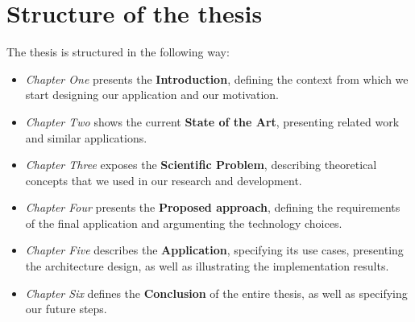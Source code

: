 \section{Structure of the thesis}
\label{section:structureOfTheThesis}

The thesis is structured in the following way:

\begin{itemize}
    \item \textit{Chapter One} presents the \textbf{Introduction}, defining the context from which we start designing our application and our motivation.
    \item \textit{Chapter Two} shows the current \textbf{State of the Art}, presenting related work and similar applications.
    \item \textit{Chapter Three} exposes the \textbf{Scientific Problem}, describing theoretical concepts that we used in our research and development.
    \item \textit{Chapter Four} presents the \textbf{Proposed approach}, defining the requirements of the final application and argumenting the technology choices.
    \item \textit{Chapter Five} describes the \textbf{Application}, specifying its use cases, presenting the architecture design, as well as illustrating the implementation results.
    \item \textit{Chapter Six} defines the \textbf{Conclusion} of the entire thesis, as well as specifying our future steps.
\end{itemize}

